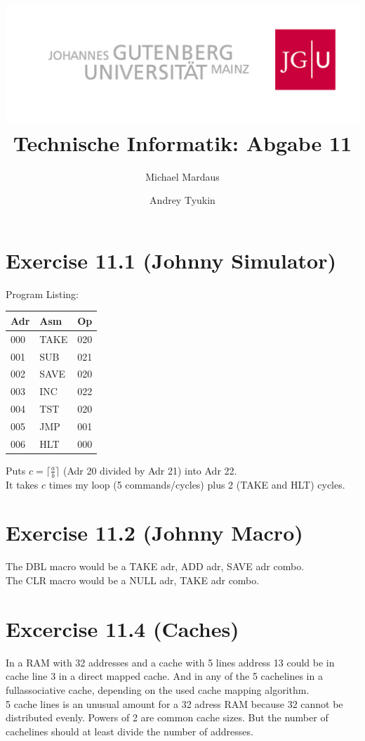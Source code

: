 \documentclass[10pt,a4paper]{scrartcl}
\author{Michael Mardaus \and Andrey Tyukin}
\title{\includegraphics[scale=0.2]{../logo_schriftzug}\\
Technische Informatik: Abgabe 11}
\newcommand{\subExercise}[1]{\vspace{0.5em} \noindent{\bf #1)}}
\begin{document}
\maketitle

\section*{Exercise 11.1 (Johnny Simulator)}
\subExercise{a}
Program Listing:\\
\begin{tabular}{l|l|l}
Adr & Asm  & Op\\\hline
000 &  TAKE & 020\\
001 &  SUB  & 021\\
002 &  SAVE & 020\\
003 &  INC  & 022\\
004 &  TST  & 020\\
005 &  JMP  & 001\\
006 &  HLT  & 000\\
\end{tabular}

Puts $c = \lceil \frac{a}{b} \rceil$ (Adr 20 divided by Adr 21) into Adr 22.\\

\subExercise{b}
It takes $c$ times my loop (5 commands/cycles) plus 2 (TAKE and HLT) cycles.

\section*{Exercise 11.2 (Johnny Macro)}
The DBL macro would be a TAKE adr, ADD adr, SAVE adr combo.\\
The CLR macro would be a NULL adr, TAKE adr combo.

\section*{Excercise 11.4 (Caches)}
\subExercise{a}
In a RAM with 32 addresses and a cache with 5 lines address 13 could be in cache line 3 in a direct mapped cache. And in any of the 5 cachelines in a fullassociative cache, depending on the used cache mapping algorithm.\\
\subExercise{b}
5 cache lines is an unusual amount for a 32 adress RAM because 32 cannot be distributed evenly.
Powers of 2 are common cache sizes. But the number of cachelines should at least divide the number of addresses.
\end{document}

